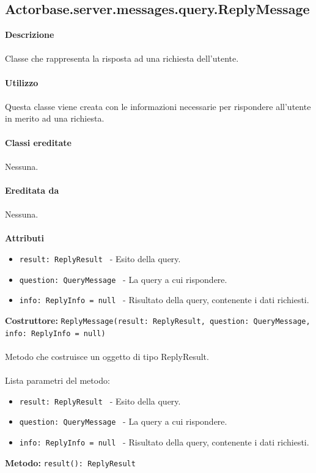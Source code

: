 \documentclass[a4paper]{article}
\begin{document}
	\subsection{Actorbase.server.messages.query.ReplyMessage}
		\textbf{Descrizione}
			\\ \\
			Classe che rappresenta la risposta ad una richiesta dell'utente.
			\\ \\
		\textbf{Utilizzo}
			\\ \\
			Questa classe viene creata con le informazioni necessarie per rispondere all'utente in merito ad una richiesta.
			\\ \\
		\textbf{Classi ereditate}
			\\ \\
			Nessuna.
			\\ \\
		\textbf{Ereditata da}
			\\ \\
			Nessuna.
			\\ \\
		\textbf{Attributi}
			\begin{itemize}
				\item \texttt{result: ReplyResult } - Esito della query.
				\item \texttt{question: QueryMessage } - La query a cui rispondere.
				\item \texttt{info: ReplyInfo = null } - Risultato della query, contenente i dati richiesti.
			\end{itemize}
			\textbf{Costruttore: } \texttt{ReplyMessage(result: ReplyResult, question: QueryMessage, info: ReplyInfo = null)}
			\\ \\
			Metodo che costruisce un oggetto di tipo ReplyResult.
			\\ \\
			Lista parametri del metodo:
			\begin{itemize}
				\item \texttt{result: ReplyResult } - Esito della query.
				\item \texttt{question: QueryMessage } - La query a cui rispondere.
				\item \texttt{info: ReplyInfo = null } - Risultato della query, contenente i dati richiesti.
			\end{itemize}
			\textbf{Metodo: } \texttt{result(): ReplyResult }
\end{document}
